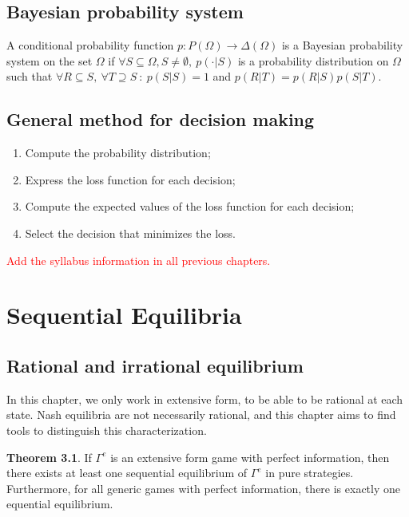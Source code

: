 \documentclass[12pt, openany]{report}
\theoremstyle{definition}
\newtheorem{thm}{Theorem}[chapter]
\begin{document}
\section{Bayesian probability system}
A conditional probability function $p:P(\Omega)\to \Delta(\Omega)$ is a Bayesian probability system on the set $\Omega$ if $\forall S\subseteq \Omega, S\neq \emptyset,\ p(\cdot|S)$ is a probability distribution on $\Omega$ such that $\forall R\subseteq S, \ \forall T\supseteq S \ : \ p(S|S)=1$ and $p(R|T)=p(R|S)p(S|T)$.
\section{General method for decision making}
\begin{enumerate}
	\item Compute the probability distribution;
	\item Express the loss function for each decision;
	\item Compute the expected values of the loss function for each decision;
	\item Select the decision that minimizes the loss.
\end{enumerate}
\textcolor{red}{Add the syllabus information in all previous chapters.}
\chapter{Sequential Equilibria}
\section{Rational and irrational equilibrium}
In this chapter, we only work in extensive form, to be able to be rational at each state. Nash equilibria are not necessarily rational, and this chapter aims to find tools to distinguish this characterization.
\begin{thm}
	If $\Gamma^e$ is an extensive form game with perfect information, then there exists at least one sequential equilibrium of $\Gamma^e$ in pure strategies. Furthermore, for all generic games with perfect information, there is exactly one equential equilibrium. 
\end{thm}
\end{document}
